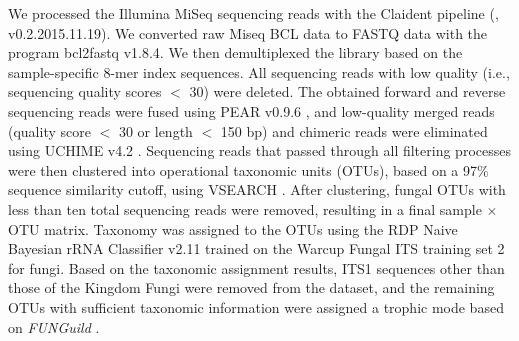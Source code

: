 We processed the Illumina MiSeq sequencing reads with the Claident pipeline (\citealp{Tanabe2013}, v0.2.2015.11.19). We converted raw Miseq BCL data to FASTQ data with the program bcl2fastq v1.8.4. We then demultiplexed the library based on the sample-specific 8-mer index sequences. All sequencing reads with low quality (i.e., sequencing quality scores $<$ 30) were deleted. The obtained forward and reverse sequencing reads were fused using PEAR v0.9.6 \citep{Zhang2014}, and low-quality merged reads (quality score $<$ 30 or length $<$ 150 bp) and chimeric reads were eliminated using UCHIME v4.2 \citep{Edgar2011}. Sequencing reads that passed through all filtering processes were then clustered into operational taxonomic units (OTUs), based on a 97$\%$ sequence similarity cutoff, using VSEARCH \citep{Rognes2016}. After clustering, fungal OTUs with less than ten total sequencing reads were removed, resulting in a final sample $\times$ OTU matrix. Taxonomy was assigned to the OTUs using the RDP Naive Bayesian rRNA Classifier v2.11 \citep{Wang2007} trained on the Warcup Fungal ITS training set 2 \citep{Deshpande2016} for fungi. Based on the taxonomic assignment results, ITS1 sequences other than those of the Kingdom Fungi were removed from the dataset, and the remaining OTUs with sufficient taxonomic information were assigned a trophic mode based on \textit{FUNGuild} \citep{Nguyen2016}.
\par



